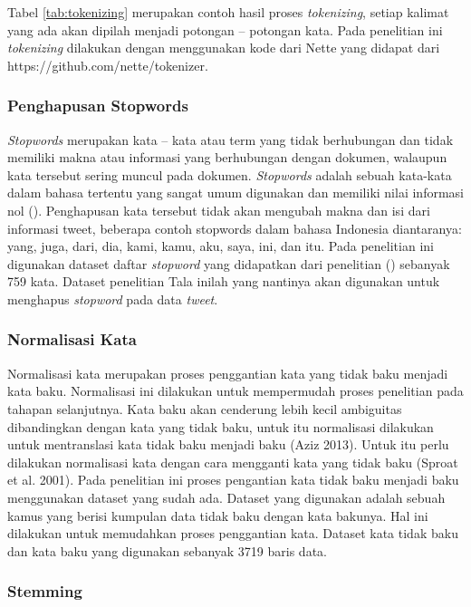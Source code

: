 Tabel \ref{tab:tokenizing} merupakan contoh hasil proses \textit{tokenizing}, setiap kalimat yang ada akan dipilah menjadi potongan – potongan kata. Pada penelitian ini \textit{tokenizing} dilakukan dengan menggunakan kode dari Nette yang didapat dari https://github.com/nette/tokenizer.


\subsubsection*{Penghapusan Stopwords}

\textit{Stopwords} merupakan kata – kata atau term yang tidak berhubungan dan tidak memiliki makna atau informasi yang berhubungan dengan dokumen, walaupun kata tersebut sering muncul pada dokumen. \textit{Stopwords} adalah sebuah kata-kata dalam bahasa tertentu yang sangat umum digunakan dan memiliki nilai informasi nol (\cite{Meyer2008}). Penghapusan kata tersebut tidak akan mengubah makna dan isi dari informasi tweet, beberapa contoh stopwords dalam bahasa  Indonesia diantaranya: yang, juga, dari, dia, kami, kamu, aku, saya, ini, dan itu. Pada penelitian ini digunakan dataset daftar \textit{stopword} yang  didapatkan dari penelitian \citeauthor{tala2003study} (\cite*{tala2003study}) sebanyak 759 kata. Dataset penelitian Tala inilah yang nantinya akan digunakan untuk menghapus \textit{stopword} pada data \textit{tweet}.


\subsubsection*{Normalisasi Kata}

Normalisasi kata merupakan proses penggantian kata yang tidak baku menjadi kata baku. Normalisasi ini dilakukan untuk mempermudah proses penelitian pada tahapan selanjutnya. Kata baku akan cenderung lebih kecil ambiguitas dibandingkan dengan kata yang tidak baku, untuk itu normalisasi dilakukan untuk mentranslasi kata tidak baku menjadi baku (Aziz 2013). Untuk itu perlu dilakukan normalisasi kata dengan cara mengganti kata yang tidak baku (Sproat et al. 2001). Pada penelitian ini proses pengantian kata tidak baku menjadi baku menggunakan dataset yang sudah ada. Dataset yang digunakan adalah sebuah kamus yang berisi kumpulan data tidak baku dengan kata bakunya. Hal ini dilakukan untuk memudahkan proses penggantian kata. Dataset kata tidak baku dan kata baku yang digunakan sebanyak 3719 baris data. 

\subsubsection*{Stemming}

